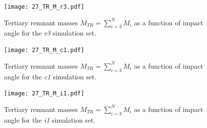 \begin{landscape}
\begin{figure}[htbp]
\begin{center}
\texttt{[image: 27\_TR\_M\_r3.pdf]}
\caption{Tertiary remnant masses $M_{TR} = \sum_{i=3}^N M_i$ as a function of impact angle for the \emph{r3} simulation set.}
\label{ch03_fig27a}
\end{center}
\end{figure}

\begin{figure}[htbp]
\begin{center}
\texttt{[image: 27\_TR\_M\_c1.pdf]}
\caption{Tertiary remnant masses $M_{TR} = \sum_{i=3}^N M_i$ as a function of impact angle for the \emph{c1} simulation set.}
\label{ch03_fig27b}
\end{center}
\end{figure}

\begin{figure}[htbp]
\begin{center}
\texttt{[image: 27\_TR\_M\_i1.pdf]}
\caption{Tertiary remnant masses $M_{TR} = \sum_{i=3}^N M_i$ as a function of impact angle for the \emph{i1} simulation set.}
\label{ch03_fig27c}
\end{center}
\end{figure}
\end{landscape}


